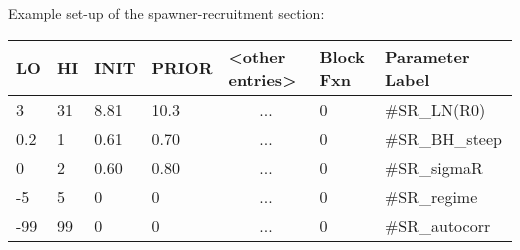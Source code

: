 Example set-up of the spawner-recruitment section:
\begin{center}
	\begin{longtable}{p{1cm} p{1cm} p{1cm}  p{1.5cm}  p{3cm}  p{2cm}  p{3.5cm}  }
		
		\hline
		LO \Tstrut & HI & INIT & PRIOR &  <other entries> & Block Fxn & Parameter Label\Bstrut\\
		\hline
		3    & 31 & 8.81 & 10.3 & \multicolumn{1}{c}{...} & 0 & \#SR\_LN(R0) \Tstrut\\
		0.2  & 1  & 0.61 & 0.70 & \multicolumn{1}{c}{...} & 0 & \#SR\_BH\_steep \\
		0    & 2  & 0.60 & 0.80 & \multicolumn{1}{c}{...} & 0 & \#SR\_sigmaR \\
		-5   & 5  & 0    & 0    & \multicolumn{1}{c}{...} & 0 & \#SR\_regime\\
		-99  & 99 & 0    & 0    & \multicolumn{1}{c}{...} & 0 & \#SR\_autocorr \Bstrut\\
		\hline
	\end{longtable}
\end{center}

